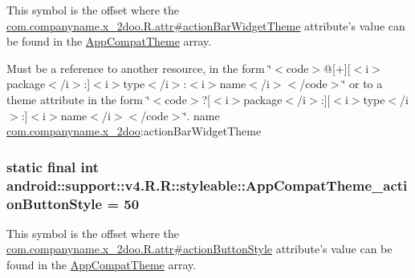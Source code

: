 This symbol is the offset where the \hyperlink{classcom_1_1companyname_1_1x__2doo_1_1_r_1_1attr_eb86e454ffa617b4b770d6cd4038bdbe}{com.companyname.x\_\-2doo.R.attr\#actionBarWidgetTheme} attribute's value can be found in the \hyperlink{classandroid_1_1support_1_1v4_1_1_r_1_1styleable_0873e92ba21076bb5a4aeadeb7f5779f}{AppCompatTheme} array.

Must be a reference to another resource, in the form \char`\"{}$<$code$>$@\mbox{[}+\mbox{]}\mbox{[}$<$i$>$package$<$/i$>$:\mbox{]}$<$i$>$type$<$/i$>$:$<$i$>$name$<$/i$>$$<$/code$>$\char`\"{} or to a theme attribute in the form \char`\"{}$<$code$>$?\mbox{[}$<$i$>$package$<$/i$>$:\mbox{]}\mbox{[}$<$i$>$type$<$/i$>$:\mbox{]}$<$i$>$name$<$/i$>$$<$/code$>$\char`\"{}.  name \hyperlink{namespacecom_1_1companyname_1_1x__2doo}{com.companyname.x\_\-2doo}:actionBarWidgetTheme \hypertarget{classandroid_1_1support_1_1v4_1_1_r_1_1styleable_4a5b2d32e9dd1e13e612b6d13ac23006}{
\subsubsection[{AppCompatTheme\_\-actionButtonStyle}]{\setlength{\rightskip}{0pt plus 5cm}static final int android::support::v4.R.R::styleable::AppCompatTheme\_\-actionButtonStyle = 50}}
\label{classandroid_1_1support_1_1v4_1_1_r_1_1styleable_4a5b2d32e9dd1e13e612b6d13ac23006}


This symbol is the offset where the \hyperlink{classcom_1_1companyname_1_1x__2doo_1_1_r_1_1attr_a6d2224b15f9db704989d9599a66d549}{com.companyname.x\_\-2doo.R.attr\#actionButtonStyle} attribute's value can be found in the \hyperlink{classandroid_1_1support_1_1v4_1_1_r_1_1styleable_0873e92ba21076bb5a4aeadeb7f5779f}{AppCompatTheme} array.

